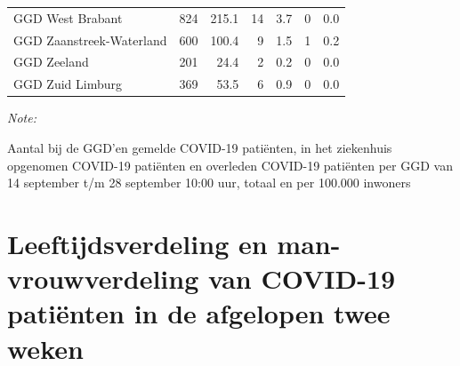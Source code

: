 \documentclass[
  english,
  man,floatsintext]{apa6}
\begin{document}
\begin{table}[H]
\begin{threeparttable}
\begin{tabular}{lrrrrrr}
GGD West Brabant & 824 & 215.1 & 14 & 3.7 & 0 & 0.0\\
GGD Zaanstreek-Waterland & 600 & 100.4 & 9 & 1.5 & 1 & 0.2\\
GGD Zeeland & 201 & 24.4 & 2 & 0.2 & 0 & 0.0\\
GGD Zuid Limburg & 369 & 53.5 & 6 & 0.9 & 0 & 0.0\\
\bottomrule
\end{tabular}
\begin{tablenotes}
\item \textit{Note: } 
\item Aantal bij de GGD’en gemelde COVID-19 patiënten, in het ziekenhuis opgenomen COVID-19 patiënten en overleden COVID-19 patiënten per GGD van 14 september t/m 28 september 10:00 uur, totaal en per 100.000 inwoners
\end{tablenotes}
\end{threeparttable}
\endgroup{}
\end{table}

\newpage

\hypertarget{leeftijdsverdeling-en-man-vrouwverdeling-van-covid-19-patiuxebnten-in-de-afgelopen-twee-weken}{%
\section{Leeftijdsverdeling en man-vrouwverdeling van COVID-19 patiënten in de afgelopen twee weken}\label{leeftijdsverdeling-en-man-vrouwverdeling-van-covid-19-patiuxebnten-in-de-afgelopen-twee-weken}}
\end{document}
